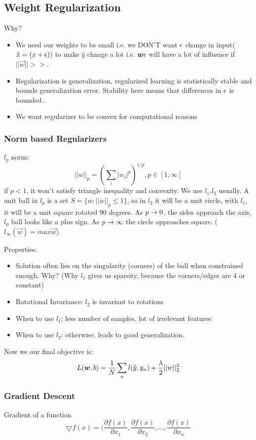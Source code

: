 \subsection{Weight Regularization}
Why?
\begin{itemize}

\item  We need our weights to be small i.e. we DON'T want $\epsilon$ change in
input($\hat x=(x+\epsilon)$) to make $\hat y$ chnage a lot i.e. $\boldsymbol{w}\epsilon$ will have a lot of influence if $||\vec w|| >>$.
\item Regularization is generalization, regularized learning is
  statistically stable and bounds generalization error. Stability here
  means that differences in $\epsilon$ is bounded..
\item We want regularizer to be convex for computational reasons
\end{itemize}

\subsubsection{Norm based Regularizers}
$l_p$ norm: $$||w||_p = (\sum_i|w_i|^p)^{1/p}, p\in[1,\infty]$$
if $p<1$, it won't satisfy triangle inequality and convexity.
We use $l_1$,$l_2$ usually. 
A unit ball in $l_p$ is a set $S=\{w:||w||_p \le 1\}$, so in $l_2$ it
will be a unit circle, with $l_1$, it will be a unit square rotated 90
degrees. As $p\rightarrow 0$, the sides approach the axis, $l_0$ ball looks
like a plus sign. As $p\rightarrow \infty$ the circle approaches
square. ($l_\infty(\vec w) = max \vec w$).

Properties:
\begin{itemize}
\item Solution often lies on the singularity (corners) of the ball
  when constrained enough. Why? (Why $l_1$ gives us sparsity, because
  the corners/edges are 4 or constant)
\item Rotational Invariance: $l_2$ is invariant to rotations
\item When to use $l_1$: less number of samples, lot of irrelevant features
\item When to use $l_2$: otherwise, leads to good generalization.
\end{itemize}

Now we our final objective is:
$$L(\boldsymbol{w}, b) = \frac{1}{N}\sum_n l(\hat y, y_n) +
\frac{\lambda}{2}||w||_2^2$$

\subsubsection{Gradient Descent}
\label{sec:graddescent}
Gradient of a function $$\bigtriangledown f(x) = (\frac{\partial
  f(x)}{\partial x_1}, \frac{\partial
  f(x)}{\partial x_2},\dots, \frac{\partial
  f(x)}{\partial x_n}$$

